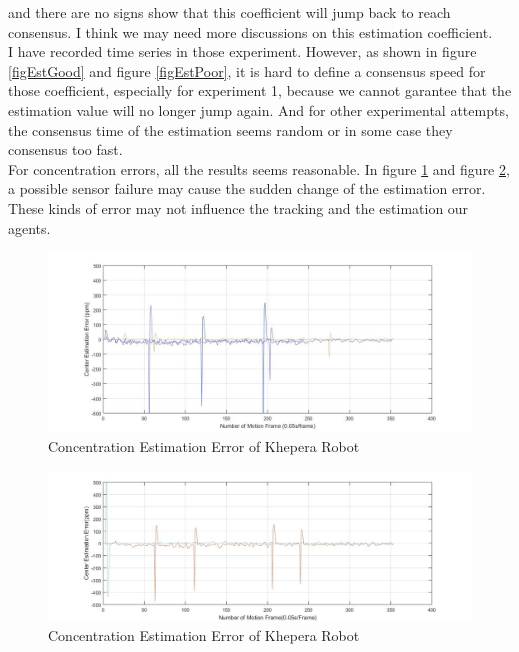 \documentclass{article}
\begin{document}
and there are no signs show that this coefficient will jump back to reach consensus. 
I think we may need more discussions on this estimation coefficient. \\
I have recorded time series in those experiment. 
However, as shown in figure \ref{figEstGood} and figure \ref{figEstPoor}, it is hard to define a consensus speed for those coefficient, especially for 
experiment 1, because we cannot garantee that the estimation value will no longer jump again. 
And for other experimental attempts, the consensus time of the estimation seems random or in some case they consensus too fast.
\\
For concentration errors, all the results seems reasonable. 
In figure \ref{figErrGood} and figure \ref{figErrPoor}, a possible sensor failure may cause the sudden change of the estimation error. 
These kinds of error may not influence the tracking and the estimation our agents.
\begin{figure}[htbp]
\centering
\includegraphics[width=12cm]{ErrorresultGood} 
\caption{Concentration Estimation Error of Khepera Robot}\label{figErrGood}
\end{figure}
\begin{figure}[htbp]
\centering
\includegraphics[width=12cm]{ErrorresultPoor} 
\caption{Concentration Estimation Error of Khepera Robot}\label{figErrPoor}
\end{figure}
\end{document}
